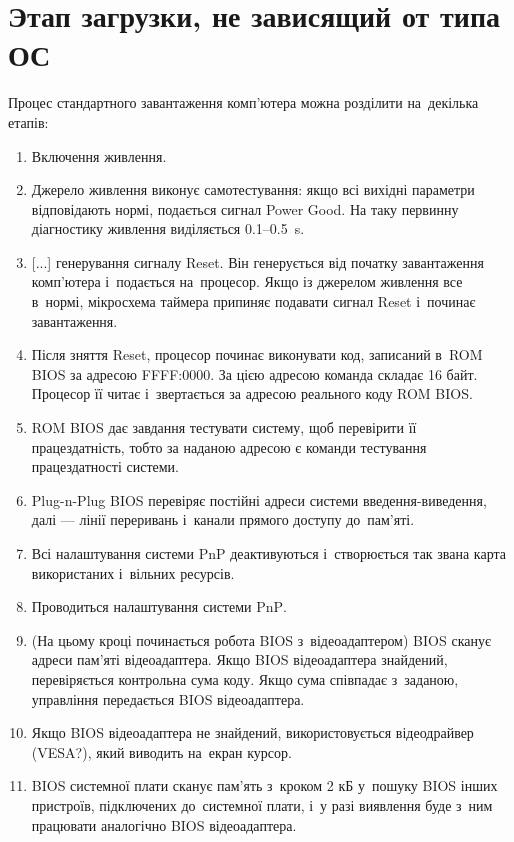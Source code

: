 \documentclass[
	a4paper,
	oneside,
	DIV = 14,
	fontsize = 14pt,
	headings = normal,
]{scrartcl}
\begin{document}
	\section{Этап загрузки, не зависящий от типа ОС}
		Процес стандартного завантаження комп'ютера можна розділити на~декілька етапів:
		\begin{enumerate}
			\item Включення живлення.
			\item Джерело живлення виконує самотестування: якщо всі вихідні параметри відповідають нормі, подається сигнал \textenglish{Power Good}. На таку первинну діагностику живлення виділяється \num{0.1}–\SI{0.5}{\second}.
			\item {[...]} генерування сигналу \textenglish{Reset}. Він генерується від початку завантаження комп'ютера і~подається на~процесор. Якщо із джерелом живлення все в~нормі, мікросхема таймера припиняє подавати сигнал \textenglish{Reset} і~починає завантаження.
			\item Після зняття \textenglish{Reset}, процесор починає виконувати код, записаний в~ROM BIOS за адресою FFFF:0000. За цією адресою команда складає 16 байт. Процесор її читає і~звертається за адресою реального коду \textenglish{ROM BIOS}.
			\item \textenglish{ROM BIOS} дає завдання тестувати систему, щоб перевірити її працездатність, тобто за наданою адресою є команди тестування працездатності системи. 
			\item \textenglish{Plug-n-Plug BIOS} перевіряє постійні адреси системи введення-виведення, далі — лінії переривань і~канали прямого доступу до~пам'яті.
			\item Всі налаштування системи \textenglish{PnP} деактивуються і~створюється так звана карта використаних і~вільних ресурсів.
			\item Проводиться налаштування системи \textenglish{PnP}.
			\item (На цьому кроці починається робота \textenglish{BIOS} з~відеоадаптером) \textenglish{BIOS} сканує адреси пам'яті відеоадаптера. Якщо BIOS відеоадаптера знайдений, перевіряється контрольна сума коду. Якщо сума співпадає з~заданою, управління передається \textenglish{BIOS} відеоадаптера.
			\item Якщо \textenglish{BIOS} відеоадаптера не знайдений, використовується відеодрайвер (\textenglish{VESA?}), який виводить на~екран курсор.
			\item \textenglish{BIOS} системної плати сканує пам'ять з~кроком 2 кБ у~пошуку \textenglish{BIOS} інших пристроїв, підключених до~системної плати, і~у разі виявлення буде з~ним працювати аналогічно \textenglish{BIOS} відеоадаптера.

\end{enumerate}
\end{document}
